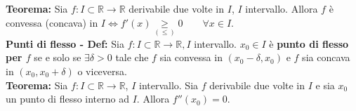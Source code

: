 \documentclass{article}
\begin{document}
\noindent\textbf{Teorema:} Sia $f: I \subset \mathbb{R} \xrightarrow{} \mathbb{R}$ derivabile due volte in $I$, $I$ intervallo. Allora $f$ è convessa (concava) in $I \iff f'(x) \underset{(\leq)}{\geq} 0 \qquad \forall x \in I$. \\

\noindent\textbf{Punti di flesso - Def:} Sia $f: I \subset \mathbb{R} \xrightarrow{} \mathbb{R}, I$ intervallo. $x_0 \in I$ è \textbf{punto di flesso per $f$} se e solo se $\exists \delta > 0$ tale che $f$ sia convessa in $(x_0 - \delta, x_0)$ e $f$ sia concava in $(x_0, x_0 + \delta)$ o viceversa.\\

\noindent\textbf{Teorema:} Sia $f: I \subset \mathbb{R} \xrightarrow{} \mathbb{R}$, $I$ intervallo. Sia $f$ derivabile due volte in $I$ e sia $x_0$ un punto di flesso interno ad $I$. Allora $f''(x_0) = 0$.
\end{document}
